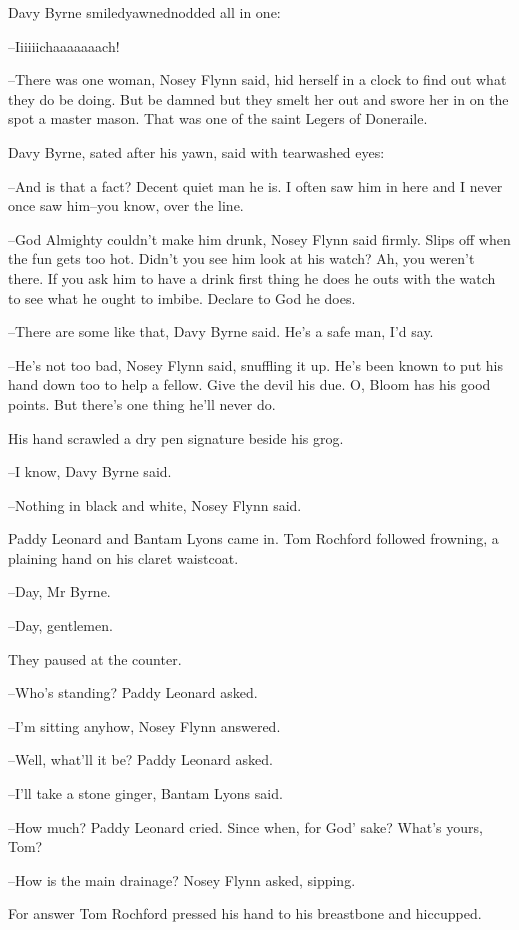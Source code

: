 Davy Byrne smiledyawnednodded all in one:

--Iiiiiichaaaaaaach!

--There was one woman, Nosey Flynn said, hid herself in a clock to find
out what they do be doing. But be damned but they smelt her out and swore
her in on the spot a master mason. That was one of the saint Legers of
Doneraile.

Davy Byrne, sated after his yawn, said with tearwashed eyes:

--And is that a fact? Decent quiet man he is. I often saw him in here and
I never once saw him--you know, over the line.

--God Almighty couldn't make him drunk, Nosey Flynn said firmly. Slips
off when the fun gets too hot. Didn't you see him look at his watch? Ah,
you weren't there. If you ask him to have a drink first thing he does he
outs with the watch to see what he ought to imbibe. Declare to God he
does.

--There are some like that, Davy Byrne said. He's a safe man, I'd say.

--He's not too bad, Nosey Flynn said, snuffling it up. He's been known to
put his hand down too to help a fellow. Give the devil his due. O, Bloom
has his good points. But there's one thing he'll never do.

His hand scrawled a dry pen signature beside his grog.

--I know, Davy Byrne said.

--Nothing in black and white, Nosey Flynn said.

Paddy Leonard and Bantam Lyons came in. Tom Rochford followed frowning, a
plaining hand on his claret waistcoat.

--Day, Mr Byrne.

--Day, gentlemen.

They paused at the counter.

--Who's standing? Paddy Leonard asked.

--I'm sitting anyhow, Nosey Flynn answered.

--Well, what'll it be? Paddy Leonard asked.

--I'll take a stone ginger, Bantam Lyons said.

--How much? Paddy Leonard cried. Since when, for God' sake? What's yours,
Tom?

--How is the main drainage? Nosey Flynn asked, sipping.

For answer Tom Rochford pressed his hand to his breastbone and hiccupped.

